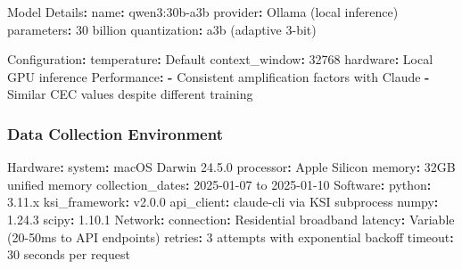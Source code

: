 \documentclass[
  11pt]{article}
\newenvironment{Shaded}{}{}
\newcommand{\AttributeTok}[1]{\textcolor[rgb]{0.49,0.56,0.16}{#1}}
\newcommand{\DecValTok}[1]{\textcolor[rgb]{0.25,0.63,0.44}{#1}}
\newcommand{\FloatTok}[1]{\textcolor[rgb]{0.25,0.63,0.44}{#1}}
\newcommand{\FunctionTok}[1]{\textcolor[rgb]{0.02,0.16,0.49}{#1}}
\newcommand{\KeywordTok}[1]{\textcolor[rgb]{0.00,0.44,0.13}{\textbf{#1}}}
\begin{document}
\begin{Shaded}
\begin{Highlighting}[]
\FunctionTok{Model Details}\KeywordTok{:}
\AttributeTok{  }\FunctionTok{name}\KeywordTok{:}\AttributeTok{ qwen3:30b{-}a3b}
\AttributeTok{  }\FunctionTok{provider}\KeywordTok{:}\AttributeTok{ Ollama (local inference)}
\AttributeTok{  }\FunctionTok{parameters}\KeywordTok{:}\AttributeTok{ 30 billion}
\AttributeTok{  }\FunctionTok{quantization}\KeywordTok{:}\AttributeTok{ a3b (adaptive 3{-}bit)}

\FunctionTok{Configuration}\KeywordTok{:}
\AttributeTok{  }\FunctionTok{temperature}\KeywordTok{:}\AttributeTok{ Default}
\AttributeTok{  }\FunctionTok{context\_window}\KeywordTok{:}\AttributeTok{ }\DecValTok{32768}
\AttributeTok{  }\FunctionTok{hardware}\KeywordTok{:}\AttributeTok{ Local GPU inference}
\AttributeTok{  }
\FunctionTok{Performance}\KeywordTok{:}
\AttributeTok{  }\KeywordTok{{-}}\AttributeTok{ Consistent amplification factors with Claude}
\AttributeTok{  }\KeywordTok{{-}}\AttributeTok{ Similar CEC values despite different training}
\end{Highlighting}
\end{Shaded}

\subsubsection{Data Collection
Environment}\label{data-collection-environment}

\begin{Shaded}
\begin{Highlighting}[]
\FunctionTok{Hardware}\KeywordTok{:}
\AttributeTok{  }\FunctionTok{system}\KeywordTok{:}\AttributeTok{ macOS Darwin 24.5.0}
\AttributeTok{  }\FunctionTok{processor}\KeywordTok{:}\AttributeTok{ Apple Silicon}
\AttributeTok{  }\FunctionTok{memory}\KeywordTok{:}\AttributeTok{ 32GB unified memory}
\AttributeTok{  }\FunctionTok{collection\_dates}\KeywordTok{:}\AttributeTok{ 2025{-}01{-}07 to 2025{-}01{-}10}
\AttributeTok{  }
\FunctionTok{Software}\KeywordTok{:}
\AttributeTok{  }\FunctionTok{python}\KeywordTok{:}\AttributeTok{ 3.11.x}
\AttributeTok{  }\FunctionTok{ksi\_framework}\KeywordTok{:}\AttributeTok{ v2.0.0}
\AttributeTok{  }\FunctionTok{api\_client}\KeywordTok{:}\AttributeTok{ claude{-}cli via KSI subprocess}
\AttributeTok{  }\FunctionTok{numpy}\KeywordTok{:}\AttributeTok{ }\FloatTok{1.24.3}
\AttributeTok{  }\FunctionTok{scipy}\KeywordTok{:}\AttributeTok{ }\FloatTok{1.10.1}
\AttributeTok{  }
\FunctionTok{Network}\KeywordTok{:}
\AttributeTok{  }\FunctionTok{connection}\KeywordTok{:}\AttributeTok{ Residential broadband}
\AttributeTok{  }\FunctionTok{latency}\KeywordTok{:}\AttributeTok{ Variable (20{-}50ms to API endpoints)}
\AttributeTok{  }\FunctionTok{retries}\KeywordTok{:}\AttributeTok{ 3 attempts with exponential backoff}
\AttributeTok{  }\FunctionTok{timeout}\KeywordTok{:}\AttributeTok{ 30 seconds per request}
\end{Highlighting}
\end{Shaded}
\end{document}
